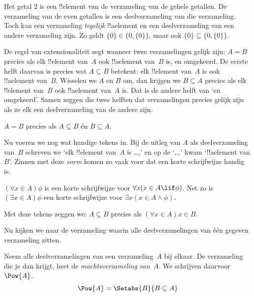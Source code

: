 \documentclass[openany]{memoir}
\begin{document}
\begin{ex}
Het getal $2$ is een !!{element} van de verzameling van de gehele
getallen. De verzameling van de even getallen is een deelverzameling
van die verzameling. Toch kan een verzameling \emph{tegelijk} !!a{element}
en een deelverzameling van een andere verzameling zijn. Zo geldt
$\{0\} \in \{0, \{0\}\}$, maar ook
$\{0\} \subseteq \{0, \{0\}\}$.
\end{ex}

De regel van extensionaliteit zegt wanneer twee verzamelingen gelijk
zijn: $A = B$ precies als elk !!{element} van~$A$ ook !!a{element}
van~$B$ is, en omgekeerd. De eerste helft daarvan is precies wat
$A \subseteq B$ betekent: elk !!{element} van~$A$ is ook
!!a{element} van~$B$. Wisselen we $A$ en $B$ om, dan krijgen we
$B \subseteq A$ precies als elk !!{element} van~$B$ ook !!a{element}
van~$A$ is. Dat is de andere helft van ‘en omgekeerd’. Samen zeggen
die twee helften dat verzamelingen precies gelijk zijn als ze elk een
deelverzameling van de andere zijn.

\begin{prop}
$A = B$ precies als $A \subseteq B$ én $B \subseteq A$.
\end{prop}

Nu voeren we nog wat handige tekens in. Bij de uitleg van
$A$ als deelverzameling van~$B$ schreven we ‘elk !!{element} van~$A$
is \dots,’ en op de ‘$\dots$’ kwam ‘!!a{element} van $B$’. Zinnen met
deze \emph{vorm} komen zo vaak voor dat een korte schrijfwijze handig
is.

\begin{defn}
$(\forall x \in A)\phi$ is een korte schrijfwijze voor $\forall x(x
\in A \lif \phi)$. Net zo is $(\exists x \in A)\phi$ een korte
schrijfwijze voor $\exists x(x \in A \land \phi)$.
\end{defn}

Met deze tekens zeggen we: $A \subseteq B$ precies als
$(\forall x \in A)x \in B$.

Nu kijken we naar de verzameling waarin alle deelverzamelingen van één
gegeven verzameling zitten.

\begin{defn}[Machtsverzameling]
Neem alle deelverzamelingen van een verzameling~$A$ bij elkaar. De
verzameling die je dan krijgt, heet de \emph{machtsverzameling van}~$A$.
We schrijven daarvoor $\Pow{A}$.
  \[
    \Pow{A} = \Setabs{B}{B \subseteq A} 
  \]
\end{defn}
\end{document}
